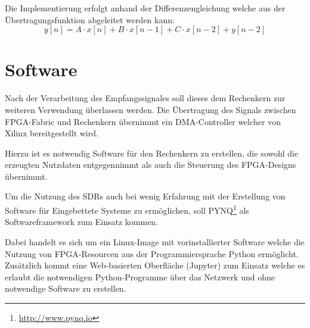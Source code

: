 Die Implementierung erfolgt anhand der Differenzengleichung welche aus der Übertragungsfunktion abgeleitet werden kann: 
\begin{equation}
	y[n] = A\cdot x[n] + B\cdot x[n-1] + C\cdot x[n-2] + y[n-2]
\end{equation}

\section{Software}
Nach der Verarbeitung des Empfangssignales soll dieses dem Rechenkern zur weiteren Verwendung überlassen werden.
Die Übertragung des Signals zwischen \acs{FPGA}-Fabric und Rechenkern übernimmt ein \acs{DMA}-Controller welcher von Xilinx bereitgestellt wird.

Hierzu ist es notwendig Software für den Rechenkern zu erstellen, die sowohl die erzeugten Nutzdaten entgegennimmt als auch die Steuerung des \acs{FPGA}-Designs übernimmt.

Um die Nutzung des \acs{SDR}s auch bei wenig Erfahrung mit der Erstellung von Software für Eingebettete Systeme zu ermöglichen, 
soll \acs{PYNQ}\footnote{\href{http://www.pynq.io}{http://www.pynq.io}} als Softwareframework zum Einsatz kommen. 

Dabei handelt es sich um ein Linux-Image mit vorinstallierter Software welche die Nutzung von \acs{FPGA}-Resourcen aus der Programmiersprache Python ermöglicht.
Zusätzlich kommt eine Web-basierten Oberfläche (Jupyter) zum Einsatz welche es erlaubt die notwendigen Python-Programme über das Netzwerk und ohne notwendige Software zu erstellen.

